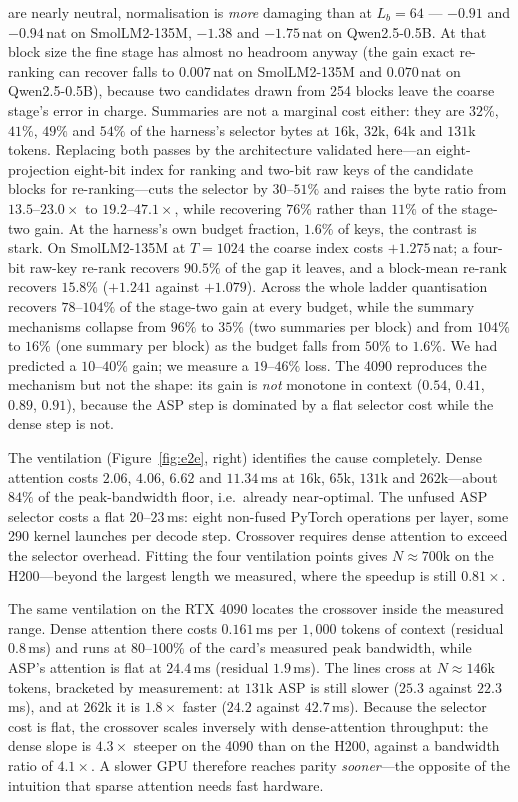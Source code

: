 \documentclass[sigconf,nonacm,11pt]{acmart}
\begin{document}
are nearly neutral, normalisation is \emph{more} damaging than at $L_b=64$ --- $-0.91$ and
$-0.94$\,nat on SmolLM2-135M, $-1.38$ and $-1.75$\,nat on Qwen2.5-0.5B. At that block
size the fine stage has almost no headroom anyway (the gain exact re-ranking can recover
falls to $0.007$\,nat on SmolLM2-135M and $0.070$\,nat on Qwen2.5-0.5B), because two
candidates drawn from 254 blocks leave the coarse stage's error in charge. Summaries are not a marginal cost either: they are $32\%$, $41\%$, $49\%$ and $54\%$ of
the harness's selector bytes at $16$k, $32$k, $64$k and $131$k tokens. Replacing both
passes by the architecture validated here---an eight-projection eight-bit index for
ranking and two-bit raw keys of the candidate blocks for re-ranking---cuts the selector
by $30$--$51\%$ and raises the byte ratio from $13.5$--$23.0\times$ to
$19.2$--$47.1\times$, while recovering $76\%$ rather than $11\%$ of the stage-two gain. At the harness's own budget fraction, $1.6\%$ of keys, the contrast is stark. On
SmolLM2-135M at $T=1024$ the coarse index costs $+1.275$\,nat; a four-bit raw-key
re-rank recovers $90.5\%$ of the gap it leaves, and a block-mean re-rank recovers
$15.8\%$ ($+1.241$ against $+1.079$). Across the whole ladder quantisation recovers
$78$--$104\%$ of the stage-two gain at every budget, while the summary mechanisms
collapse from $96\%$ to $35\%$ (two summaries per block) and from $104\%$ to $16\%$
(one summary per block) as the budget falls from $50\%$ to $1.6\%$. We had predicted a $10$--$40\%$ gain; we measure a
$19$--$46\%$ loss. The 4090 reproduces the mechanism but not the shape: its gain
is \emph{not} monotone in context ($0.54$, $0.41$, $0.89$, $0.91$), because the
ASP step is dominated by a flat selector cost while the dense step is not.

The ventilation (Figure~\ref{fig:e2e}, right) identifies the cause completely.
Dense attention costs $2.06$, $4.06$, $6.62$ and $11.34$\,ms at $16$k, $65$k,
$131$k and $262$k---about $84\%$ of the peak-bandwidth floor, i.e.\ already
near-optimal. The unfused ASP selector costs a flat $20$--$23$\,ms: eight
non-fused PyTorch operations per layer, some 290 kernel launches per decode step.
Crossover requires dense attention to exceed the selector overhead. Fitting the
four ventilation points gives $N\approx700$k on the H200---beyond the largest
length we measured, where the speedup is still $0.81\times$.

The same ventilation on the RTX 4090 locates the crossover inside the measured
range. Dense attention there costs $0.161$\,ms per $1{,}000$ tokens of context
(residual $0.8$\,ms) and runs at $80$--$100\%$ of the card's measured peak
bandwidth, while ASP's attention is flat at $24.4$\,ms (residual $1.9$\,ms). The
lines cross at $N\approx146$k tokens, bracketed by measurement: at $131$k ASP is
still slower ($25.3$ against $22.3$\,ms), and at $262$k it is $1.8\times$ faster
($24.2$ against $42.7$\,ms). Because the selector cost is flat, the crossover
scales inversely with dense-attention throughput: the dense slope is $4.3\times$
steeper on the 4090 than on the H200, against a bandwidth ratio of $4.1\times$. A
slower GPU therefore reaches parity \emph{sooner}---the opposite of the intuition
that sparse attention needs fast hardware.
\end{document}
